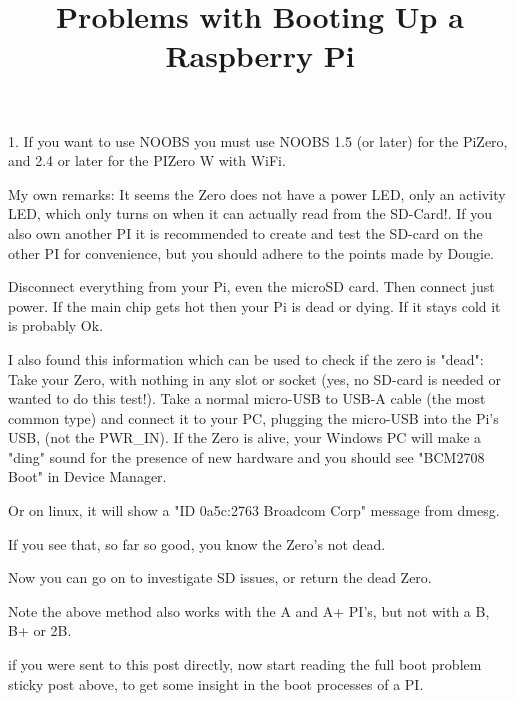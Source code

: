\documentclass{article}\usepackage[]{graphicx}\usepackage[]{color}
\title{Problems with Booting Up a Raspberry Pi}
\begin{document}
\maketitle

1. If you want to use NOOBS you must use NOOBS 1.5 (or later) for the PiZero, and 2.4 or later for the PIZero W with WiFi.

My own remarks:
It seems the Zero does not have a power LED, only an activity LED, which only turns on when it can actually read from the SD-Card!. If you also own another PI it is recommended to create and test the SD-card on the other PI for convenience, but you should adhere to the points made by Dougie.

Disconnect everything from your Pi, even the microSD card. Then connect just power. If the main chip gets hot then your Pi is dead or dying. If it stays cold it is probably Ok.

I also found this information which can be used to check if the zero is "dead":
Take your Zero, with nothing in any slot or socket (yes, no SD-card is needed or wanted to do this test!). Take a normal micro-USB to USB-A cable (the most common type) and connect it to your PC, plugging the micro-USB into the Pi's USB, (not the PWR\_IN). If the Zero is alive, your Windows PC will make a "ding" sound for the presence of new hardware and you should see "BCM2708 Boot" in Device Manager.

Or on linux, it will show a "ID 0a5c:2763 Broadcom Corp" message from dmesg.

If you see that, so far so good, you know the Zero's not dead.

Now you can go on to investigate SD issues, or return the dead Zero.

Note the above method also works with the A and A+ PI's, but not with a B, B+ or 2B.

if you were sent to this post directly, now start reading the full boot problem sticky post above, to get some insight in the boot processes of a PI.
\end{document}
